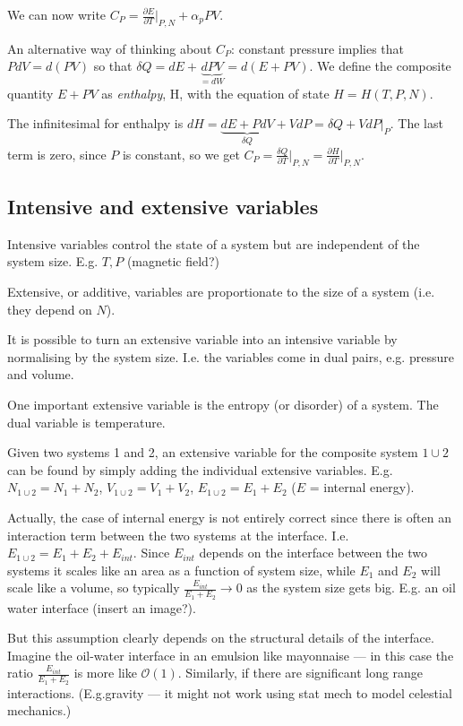 \documentclass{article}
\begin{document}
We can now write $C_P = \frac{\partial E}{\partial T}\vert_{P,N} + \alpha_pPV$.

An alternative way of thinking about $C_P$: constant pressure implies that $PdV = d(PV)$ so that $\delta Q = dE + \underbrace{dPV}_{=dW} = d(E+PV)$. We define the composite quantity $E+PV$ as \emph{enthalpy}, H, with the equation of state $H = H(T,P,N)$.

The infinitesimal for enthalpy is $dH = \underbrace{dE +PdV}_{\delta Q}+ VdP = \delta Q + VdP\vert_{P}$. The last term is zero, since $P$ is constant, so we get $C_P = \frac{\delta Q}{\partial T}\vert_{P,N} = \frac{\partial H}{\partial T}\vert_{P,N} $.

\subsection*{Intensive and extensive variables}

Intensive variables control the state of a system but are independent of the system size. E.g. $T,P$ (magnetic field?)

Extensive, or additive, variables are proportionate to the size of a system (i.e. they depend on $N$).

It is possible to turn an extensive variable into an intensive variable by normalising by the system size. I.e. the variables come in dual pairs, e.g. pressure and volume.

One important extensive variable is the entropy (or disorder) of a system. The dual variable is temperature.

Given two systems 1 and 2, an extensive variable for the composite system $1\cup2$ can be found by simply adding the individual extensive variables. E.g. $N_{1\cup2} = N_1 + N_2$, $V_{1\cup2} = V_1 + V_2$, $E_{1\cup2} = E_1 + E_2$ ($E$ = internal energy).

Actually, the case of internal energy is not entirely correct since there is often an interaction term between the two systems at the interface. I.e. $E_{1\cup2} = E_1+E_2+E_{int}$. Since $E_{int}$ depends on the interface between the two systems it scales like an area as a function of system size, while $E_1$ and $E_2$ will scale like a volume, so typically $\frac{E_{int}}{E_1+E_2}\rightarrow0$ as the system size gets big. E.g. an oil water interface (insert an image?).

But this assumption clearly depends on the structural details of the interface. Imagine the oil-water interface in an emulsion like mayonnaise --- in this case the ratio  $\frac{E_{int}}{E_1+E_2}$ is more like $\mathcal{O}(1)$.
Similarly, if there are significant long range interactions. (E.g.gravity --- it might not work using stat mech to model celestial mechanics.)
\end{document}
